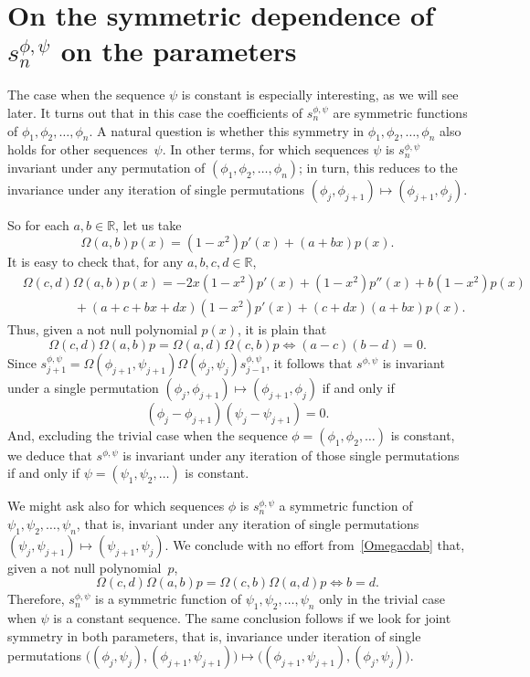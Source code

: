 \documentclass[10pt, a4paper, leqno]{amsart}
\numberwithin{equation}{section}
\theoremstyle{plain}
\theoremstyle{remark}
\newcommand{\RR}{\mathbb{R}}
\newcommand{\spp}{s^{\phi,\psi}}
\begin{document}
\section{On the symmetric dependence of \texorpdfstring{$\spp_n$}{snphipsi} on the parameters}
\label{sec4}

The case when the sequence $\psi$ is constant is especially interesting, as we will see later. It turns out that in this case the coefficients of $\spp_n$ are symmetric functions of $\phi_1, \phi_2,\allowbreak \dots, \phi_n$. A natural question is whether this symmetry in $\phi_1, \phi_2,\allowbreak \dots, \phi_n$ also holds for other sequences~$\psi$. In other terms, for which sequences $\psi$ is $\spp_n$ invariant under any permutation of $(\phi_1, \phi_2, \dots, \phi_n)$; in turn, this reduces to the invariance under any iteration of single permutations $(\phi_j, \phi_{j+1}) \mapsto (\phi_{j+1}, \phi_j)$.

So for each $a, b \in \RR$, let us take
\[
  \Omega(a,b) p(x) = (1-x^2) p'(x) + (a + bx) p(x).
\]
It is easy to check that, for any $a, b, c, d \in \RR$,
\begin{equation}
\label{Omegacdab}
\begin{aligned}
  &\Omega(c,d) \Omega(a,b) p(x)
  = - 2x (1-x^2) p'(x) + (1-x^2) p''(x) + b(1-x^2) p(x)
  \\
  &\qquad\qquad + (a + c + bx + dx) (1-x^2) p'(x)
  + (c+dx)(a+bx) p(x). 
\end{aligned}
\end{equation}
Thus, given a not null polynomial $p(x)$, it is plain that
\[
  \Omega(c,d) \Omega(a,b) p = \Omega(a,d) \Omega(c,b) p
  \iff (a-c) (b-d) = 0.
\]
Since $\spp_{j+1} = \Omega(\phi_{j+1},\psi_{j+1}) \Omega(\phi_j, \psi_j) \spp_{j-1}$,
it follows that $\spp$ is invariant under a single permutation $(\phi_j, \phi_{j+1}) \mapsto (\phi_{j+1}, \phi_j)$ if and only if
\[
  (\phi_j - \phi_{j+1}) (\psi_j - \psi_{j+1}) = 0.
\]
And, excluding the trivial case when the sequence $\phi = (\phi_1, \phi_2, \dots)$ is constant, we deduce that $\spp$ is invariant under any iteration of those single permutations if and only if $\psi = (\psi_1, \psi_2, \dots)$ is constant.

We might ask also for which sequences $\phi$ is $\spp_n$ a symmetric function of $\psi_1,\allowbreak \psi_2,\allowbreak \dots,\allowbreak \psi_n$, that is, invariant under any iteration of single permutations $(\psi_j, \psi_{j+1}) \mapsto (\psi_{j+1}, \psi_j)$. We conclude with no effort from~\eqref{Omegacdab} that, given a not null polynomial~$p$,
\[
  \Omega(c,d) \Omega(a,b) p = \Omega(c,b) \Omega(a,d) p
  \iff b = d.
\]
Therefore, $\spp_n$ is a symmetric function of $\psi_1,\psi_2, \dots, \psi_n$ only in the trivial case when $\psi$ is a constant sequence. The same conclusion follows if we look for joint symmetry in both parameters, that is, invariance under iteration of single permutations $\big((\phi_j,\psi_j), (\phi_{j+1},\psi_{j+1}) \big) \mapsto \big((\phi_{j+1},\psi_{j+1}), (\phi_j,\psi_j) \big)$.
\end{document}
